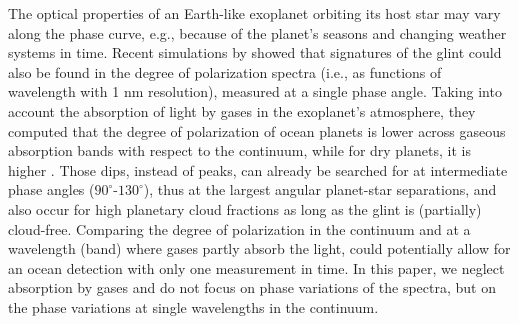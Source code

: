 \documentclass[
    usenatbib,
]{mnras}
\begin{document}

The optical properties of an Earth-like exoplanet orbiting its host star may vary along the phase curve, e.g., because of the planet's seasons and changing weather systems in time. Recent simulations by \citet{trees2022} showed that signatures of the glint could also be found in the degree of polarization spectra (i.e., as functions of wavelength with 1 nm resolution), measured at a single phase angle. Taking into account the absorption of light by gases in the exoplanet's atmosphere, they computed that the degree of polarization of ocean planets is lower across gaseous absorption bands with respect to the continuum, while for dry planets, it is higher \citep[see][]{stam2008}. Those dips, instead of peaks, can already be searched for at intermediate phase angles ($90^\circ$-$130^\circ$), thus at the largest angular planet-star separations, and also occur for high planetary cloud fractions as long as the glint is (partially) cloud-free. Comparing the degree of polarization in the continuum and at a wavelength (band) where gases partly absorb the light, could potentially allow for an ocean detection with only one measurement in time. In this paper, we neglect absorption by gases and do not focus on phase variations of the spectra, but on the phase variations at single wavelengths in the continuum.
 
\end{document}
